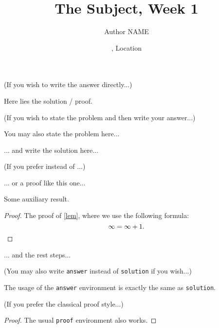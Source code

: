 \documentclass[11pt,
  logo = {example-image},
  title in boldface,
  theorem in new line,
]{homework}
\title{The Subject, Week 1}
\author{Author NAME}
\date{\TheDate{2023-12-25}, Location}
\begin{document}
\bigskip\textcolor{gray!55}{(If you wish to write the answer directly...)}

\begin{problem}
    Here lies the solution / proof.
\end{problem}


\bigskip\textcolor{gray!55}{(If you wish to state the problem and then write your answer...)}

\begin{problem}
    You may also state the problem here...
\end{problem}

\begin{solution}
    ... and write the solution here...
\end{solution}

\bigskip\textcolor{gray!55}{(If you prefer  instead of ...)}

\begin{solution}[Proof]
    ... or a proof like this one...
    \begin{lemma}\label{lem}
        Some auxiliary result.
    \end{lemma}
    \begin{proof}
        The proof of \cref{lem}, where we use the following formula:
        \[
            \infty = \infty + 1.
            \qedhere %
        \]
    \end{proof}
    ... and the rest steps...
\end{solution}


\bigskip\textcolor{gray!55}{(You may also write \texttt{answer} instead of \texttt{solution} if you wish...)}

\begin{answer}
    The usage of the \verb|answer| environment is exactly the same as \verb|solution|.
\end{answer}


\bigskip\textcolor{gray!55}{(If you prefer the classical proof style...)}

\begin{proof}
    The usual \verb|proof| environment also works.
\end{proof}


\end{document}
